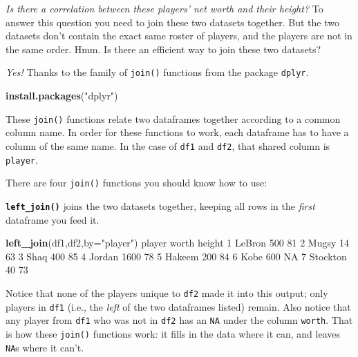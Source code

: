 \documentclass[
]{book}
\newenvironment{Shaded}{\begin{snugshade}}{\end{snugshade}}
\newcommand{\DataTypeTok}[1]{\textcolor[rgb]{0.13,0.29,0.53}{#1}}
\newcommand{\DecValTok}[1]{\textcolor[rgb]{0.00,0.00,0.81}{#1}}
\newcommand{\KeywordTok}[1]{\textcolor[rgb]{0.13,0.29,0.53}{\textbf{#1}}}
\newcommand{\NormalTok}[1]{#1}
\newcommand{\OtherTok}[1]{\textcolor[rgb]{0.56,0.35,0.01}{#1}}
\newcommand{\StringTok}[1]{\textcolor[rgb]{0.31,0.60,0.02}{#1}}
\begin{document}
\emph{Is there a correlation between these players' net worth and their height?} To answer this question you need to join these two datasets together. But the two datasets don't contain the exact same roster of players, and the players are not in the same order. Hmm. Is there an efficient way to join these two datasets?

\emph{Yes!} Thanks to the family of \texttt{join()} functions from the package \texttt{dplyr}.

\begin{Shaded}
\begin{Highlighting}[]
\KeywordTok{install.packages}\NormalTok{(}\StringTok{"dplyr"}\NormalTok{)}
\end{Highlighting}
\end{Shaded}

These \texttt{join()} functions relate two dataframes together according to a common column name. In order for these functions to work, each dataframe has to have a column of the same name. In the case of \texttt{df1} and \texttt{df2}, that shared column is \texttt{player}.

There are four \texttt{join()} functions you should know how to use:

\textbf{\texttt{left\_join()}} joins the two datasets together, keeping all rows in the \emph{first} dataframe you feed it.

\begin{Shaded}
\begin{Highlighting}[]
\KeywordTok{left_join}\NormalTok{(df1,df2,}\DataTypeTok{by=}\StringTok{"player"}\NormalTok{)}
\NormalTok{    player worth height}
\DecValTok{1}\NormalTok{   LeBron   }\DecValTok{500}     \DecValTok{81}
\DecValTok{2}\NormalTok{    Mugsy    }\DecValTok{14}     \DecValTok{63}
\DecValTok{3}\NormalTok{     Shaq   }\DecValTok{400}     \DecValTok{85}
\DecValTok{4}\NormalTok{   Jordan  }\DecValTok{1600}     \DecValTok{78}
\DecValTok{5}\NormalTok{   Hakeem   }\DecValTok{200}     \DecValTok{84}
\DecValTok{6}\NormalTok{     Kobe   }\DecValTok{600}     \OtherTok{NA}
\DecValTok{7}\NormalTok{ Stockton    }\DecValTok{40}     \DecValTok{73}
\end{Highlighting}
\end{Shaded}

Notice that none of the players unique to \texttt{df2} made it into this output; only players in \texttt{df1} (i.e., the \emph{left} of the two dataframes listed) remain. Also notice that any player from \texttt{df1} who was not in \texttt{df2} has an \texttt{NA} under the column \texttt{worth}. That is how these \texttt{join()} functions work: it fills in the data where it can, and leaves \texttt{NA}s where it can't.
\end{document}
